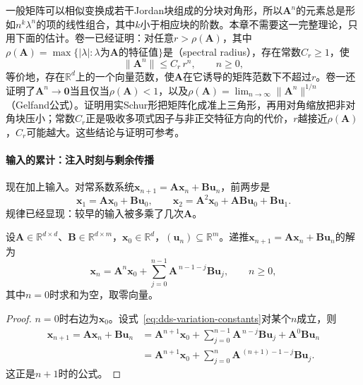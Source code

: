 一般矩阵可以相似变换成若干Jordan块组成的分块对角形，所以$\bm A^n$的元素总是形如$n^k\lambda^n$的项的线性组合，其中$k$小于相应块的阶数。本章不需要这一完整理论，只用下面的估计。卷一已经证明：对任意$r>\rho(\bm A)$，其中$\rho(\bm A)=\max\{|\lambda|:\lambda\text{为}\bm A\text{的特征值}\}$是（spectral radius），存在常数$C_r\geq1$，使
\begin{equation}
  \lVert\bm A^n\rVert\leq C_r\,r^n,\qquad n\geq0,
  \label{eq:dds-geometric-bound}
\end{equation}
等价地，存在$\mathbb R^d$上的一个向量范数，使$\bm A$在它诱导的矩阵范数下不超过$r$。卷一还证明了$\bm A^n\to\bm 0$当且仅当$\rho(\bm A)<1$，以及$\rho(\bm A)=\lim_{n\to\infty}\lVert\bm A^n\rVert^{1/n}$（Gelfand公式）。证明用实Schur形把矩阵化成准上三角形，再用对角缩放把非对角块压小；常数$C_r$正是吸收多项式因子与非正交特征方向的代价，$r$越接近$\rho(\bm A)$，$C_r$可能越大。这些结论与证明可参考。

\paragraph{输入的累计：注入时刻与剩余传播}
现在加上输入。对常系数系统$\bm x_{n+1}=\bm A\bm x_n+\bm B\bm u_n$，前两步是
\[
  \bm x_1=\bm A\bm x_0+\bm B\bm u_0,\qquad
  \bm x_2=\bm A^2\bm x_0+\bm A\bm B\bm u_0+\bm B\bm u_1 .
\]
规律已经显现：较早的输入被多乘了几次$\bm A$。

\begin{theorem}[常系数仿射递推的显式解]
\label{thm:dds-variation-constants}
设$\bm A\in\mathbb R^{d\times d}$、$\bm B\in\mathbb R^{d\times m}$，$\bm x_0\in\mathbb R^d$，$(\bm u_n)\subseteq\mathbb R^m$。递推$\bm x_{n+1}=\bm A\bm x_n+\bm B\bm u_n$的解为
\begin{equation}
  \bm x_n=\bm A^n\bm x_0+\sum_{j=0}^{n-1}\bm A^{\,n-1-j}\bm B\bm u_j,\qquad n\geq0,
  \label{eq:dds-variation-constants}
\end{equation}
其中$n=0$时求和为空，取零向量。
\end{theorem}

\begin{proof}
$n=0$时右边为$\bm x_0$。设式~\eqref{eq:dds-variation-constants}对某个$n$成立，则
\[
  \begin{aligned}
  \bm x_{n+1}=\bm A\bm x_n+\bm B\bm u_n
  &=\bm A^{n+1}\bm x_0+\sum_{j=0}^{n-1}\bm A^{\,n-j}\bm B\bm u_j+\bm A^0\bm B\bm u_n\\
  &=\bm A^{n+1}\bm x_0+\sum_{j=0}^{n}\bm A^{\,(n+1)-1-j}\bm B\bm u_j .
  \end{aligned}
\]
这正是$n+1$时的公式。
\end{proof}

